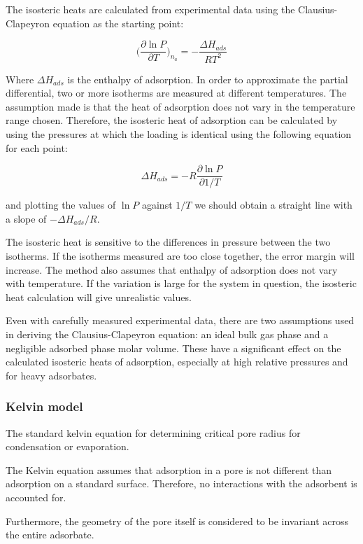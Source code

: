 The isosteric heats are calculated from experimental data using the Clausius-Clapeyron
equation as the starting point:

\begin{equation}
    \Big( \frac{\partial \ln P}{\partial T} \Big)_{n_a} = -\frac{\Delta H_{ads}}{R T^2}
\end{equation}

Where \(\Delta H_{ads}\) is the enthalpy of adsorption. In order to approximate the
partial differential, two or more isotherms are measured at different temperatures. The
assumption made is that the heat of adsorption does not vary in the temperature range
chosen. Therefore, the isosteric heat of adsorption can be calculated by using the pressures
at which the loading is identical using the following equation for each point:

\begin{equation}
    \Delta H_{ads} = - R \frac{\partial \ln P}{\partial 1 / T}
\end{equation}

and plotting the values of \(\ln P\) against \(1 / T\) we should obtain a straight
line with a slope of \(- \Delta H_{ads} / R\).

The isosteric heat is sensitive to the differences in pressure between the two isotherms. If
the isotherms measured are too close together, the error margin will increase.
The method also assumes that enthalpy of adsorption does not vary with temperature. If the
variation is large for the system in question, the isosteric heat calculation will give
unrealistic values.

Even with carefully measured experimental data, there are two assumptions used in deriving
the Clausius-Clapeyron equation: an ideal bulk gas phase and a negligible adsorbed phase
molar volume. These have a significant effect on the calculated isosteric heats of adsorption,
especially at high relative pressures and for heavy adsorbates.

\subsubsection{Kelvin model}

The standard kelvin equation for determining critical pore radius for condensation or
evaporation.

The Kelvin equation assumes that adsorption in a pore is not different than adsorption
on a standard surface. Therefore, no interactions with the adsorbent is accounted for.

Furthermore, the geometry of the pore itself is considered to be invariant across the
entire adsorbate.